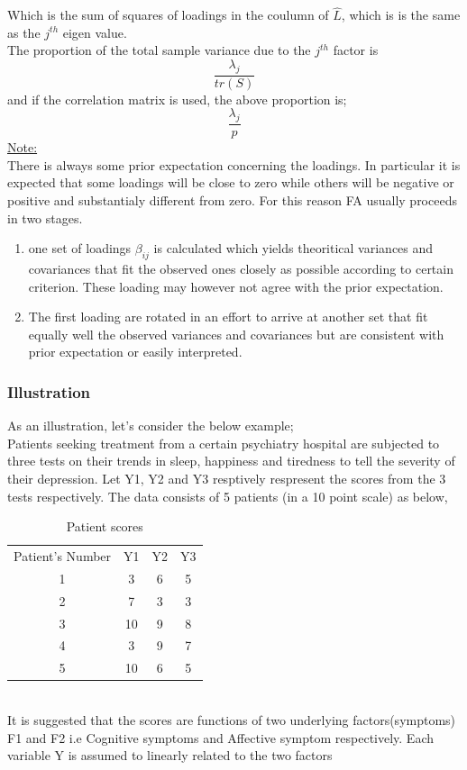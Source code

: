 \documentclass[12]{article}
\begin{document}
\noindent Which is the sum of squares of loadings in the coulumn of $\hat{L}$, which is is the same as the $j^{th}$ eigen value.\\
The proportion of the total sample variance due to the $j^{th}$ factor is $$\frac{\lambda_j}{tr(S)}$$ and if the correlation matrix is used, the above proportion is;
$$\frac{\lambda_j}{p}$$
\underline{Note:}\\
There is always some prior expectation concerning the loadings. In particular it is expected that some loadings will be close to zero while others will be negative or positive and substantialy different from zero. For this reason FA usually proceeds in two stages.
\begin{enumerate}
	\item one set of loadings $\beta_{ij}$ is calculated which yields theoritical variances and covariances that fit the observed ones closely as possible according to certain criterion. These loading may however not agree with the prior expectation.
	\item The first loading are rotated in an effort to arrive at another set that fit equally well the observed variances and covariances but are consistent with prior expectation or easily interpreted.
\end{enumerate} 
\newpage
\subsubsection*{Illustration}
\noindent As an illustration, let's consider the below example;\\
\noindent Patients seeking treatment from a certain psychiatry hospital are subjected to three tests on their trends in sleep, happiness and tiredness to tell the severity of their depression. Let Y1, Y2 and Y3 resptively respresent the scores from the 3 tests respectively. The data consists of 5 patients (in a 10 point scale) as below,
\begin{table}[ht]
	\centering
	\begin{tabular}{c c c c}
		
		Patient's Number & Y1 & Y2 & Y3 \\
		
		 1 & 3 & 6 & 5 \\
		
		 2 & 7 & 3 & 3 \\
		 3 & 10 & 9 & 8 \\
		 4 & 3 & 9& 7 \\
		 
		 5 & 10 & 6 & 5 \\
		
	\end{tabular}
		\caption{Patient scores}
		\label{tab:mytable}
\end{table}\\
It is suggested that the scores are functions of two underlying factors(symptoms) F1 and F2 i.e Cognitive symptoms and Affective symptom respectively. Each variable Y is assumed to linearly  related to the two factors
\end{document}
